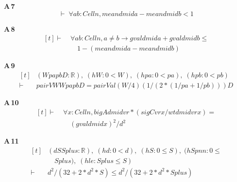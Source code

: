 \noindent\textbf{A\,7}\quad{}
{\footnotesize\[ \vdash\; \forall \mathit{a} \mathit{b} : \mathit{Cell} \mathit{n}, \mathit{mean} \mathit{d} \mathit{mid} \mathit{a} - \mathit{mean} \mathit{d} \mathit{mid} \mathit{b} < 1 \]}

\noindent\textbf{A\,8}\quad{}
{\footnotesize\[ \begin{aligned}[t]
\vdash\;&\forall \mathit{a} \mathit{b} : \mathit{Cell} \mathit{n}, \mathit{a} \neq \mathit{b} \to \mathit{gval} \mathit{d} \mathit{mid} \mathit{a} + \mathit{gval} \mathit{d} \mathit{mid} \mathit{b} \leq\\
&\quad 1 - (\mathit{mean} \mathit{d} \mathit{mid} \mathit{a} - \mathit{mean} \mathit{d} \mathit{mid} \mathit{b})
\end{aligned} \]}

\noindent\textbf{A\,9}\quad{}
{\footnotesize\[ \begin{aligned}[t]
&(\mathit{W} \mathit{pa} \mathit{pb} \mathit{D} : \mathbb{R} ),\; (\mathit{hW} : 0 < \mathit{W}),\; (\mathit{hpa} : 0 < \mathit{pa}),\; (\mathit{hpb} : 0 < \mathit{pb})\\
\vdash\;&\mathit{pairV} \mathit{W} \mathit{W} \mathit{pa} \mathit{pb} \mathit{D} = \mathit{pairVal} (\mathit{W} / 4) (1 / (2 * (1 / \mathit{pa} + 1 / \mathit{pb}))) \mathit{D}
\end{aligned} \]}

\noindent\textbf{A\,10}\quad{}
{\footnotesize\[ \begin{aligned}[t]
\vdash\;&\forall \mathit{x} : \mathit{Cell} \mathit{n}, \mathit{bigA} \mathit{d} \mathit{mid} \mathit{vr} * (\mathit{sigC} \mathit{vr} \mathit{x} / \mathit{wt} \mathit{d} \mathit{mid} \mathit{vr} \mathit{x}) =\\
&\quad (\mathit{gval} \mathit{d} \mathit{mid} \mathit{x}) ^{2} / \mathit{d} ^{2}
\end{aligned} \]}

\noindent\textbf{A\,11}\quad{}
{\footnotesize\[ \begin{aligned}[t]
&(\mathit{d} \mathit{S} \mathit{Splus} : \mathbb{R} ),\; (\mathit{hd} : 0 < \mathit{d}),\; (\mathit{hS} : 0 \leq \mathit{S}),\; (\mathit{hSpnn} : 0 \leq\\
&\quad \mathit{Splus}),\; (\mathit{hle} : \mathit{Splus} \leq \mathit{S})\\
\vdash\;&\mathit{d} ^{2} / (32 + 2 * \mathit{d} ^{2} * \mathit{S}) \leq \mathit{d} ^{2} / (32 + 2 * \mathit{d} ^{2} * \mathit{Splus})
\end{aligned} \]}

